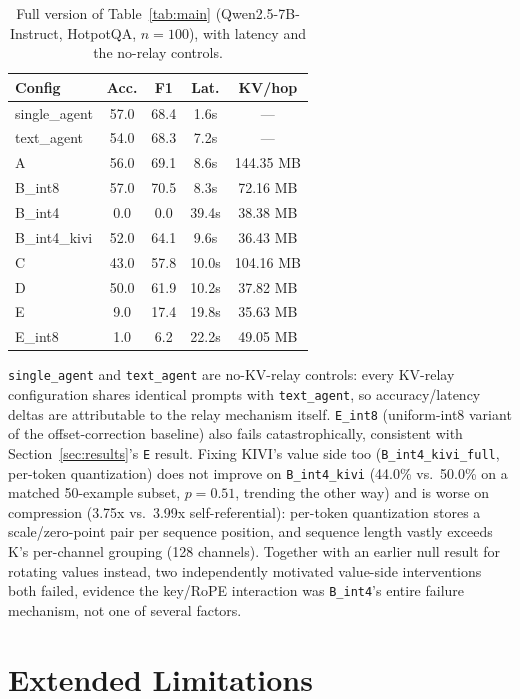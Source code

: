 \documentclass[11pt]{article}
\begin{document}
\begin{table}[h]
\centering
\small
\begin{tabular}{lcccc}
\toprule
\textbf{Config} & \textbf{Acc.} & \textbf{F1} & \textbf{Lat.} & \textbf{KV/hop} \\
\midrule
single\_agent & 57.0 & 68.4 & 1.6s & --- \\
text\_agent & 54.0 & 68.3 & 7.2s & --- \\
A & 56.0 & 69.1 & 8.6s & 144.35 MB \\
B\_int8 & 57.0 & 70.5 & 8.3s & 72.16 MB \\
B\_int4 & 0.0 & 0.0 & 39.4s & 38.38 MB \\
B\_int4\_kivi & 52.0 & 64.1 & 9.6s & 36.43 MB \\
C & 43.0 & 57.8 & 10.0s & 104.16 MB \\
D & 50.0 & 61.9 & 10.2s & 37.82 MB \\
E & 9.0 & 17.4 & 19.8s & 35.63 MB \\
E\_int8 & 1.0 & 6.2 & 22.2s & 49.05 MB \\
\bottomrule
\end{tabular}
\caption{Full version of Table~\ref{tab:main} (Qwen2.5-7B-Instruct,
HotpotQA, $n=100$), with latency and the no-relay controls.}
\label{tab:full}
\end{table}

\texttt{single\_agent} and \texttt{text\_agent} are no-KV-relay
controls: every KV-relay configuration shares identical prompts with
\texttt{text\_agent}, so accuracy/latency deltas are attributable to
the relay mechanism itself. \texttt{E\_int8} (uniform-int8 variant of
the offset-correction baseline) also fails catastrophically, consistent
with Section~\ref{sec:results}'s \texttt{E} result. Fixing KIVI's value side
too (\texttt{B\_int4\_kivi\_full}, per-token quantization) does not
improve on \texttt{B\_int4\_kivi} (44.0\% vs.\ 50.0\% on a matched
50-example subset, $p=0.51$, trending the other way) and is worse on
compression (3.75x vs.\ 3.99x self-referential): per-token quantization
stores a scale/zero-point pair per sequence position, and sequence
length vastly exceeds K's per-channel grouping (128 channels). Together
with an earlier null result for rotating values instead, two
independently motivated value-side interventions both failed, evidence
the key/RoPE interaction was \texttt{B\_int4}'s entire failure
mechanism, not one of several factors.

\section{Extended Limitations}
\label{app:limitations}
\end{document}
